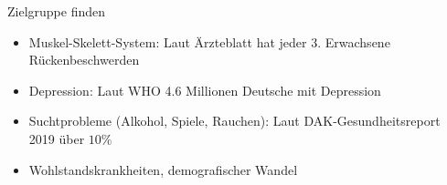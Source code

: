\documentclass[aspectratio=169,t]{beamer}
\begin{document}
\begin{frame}{Zielgruppe finden}
    \begin{itemize}
        \item Muskel-Skelett-System: Laut Ärzteblatt hat jeder 3. Erwachsene Rückenbeschwerden
        \item Depression: Laut WHO 4.6 Millionen Deutsche mit Depression
        \item Suchtprobleme (Alkohol, Spiele, Rauchen): Laut DAK-Gesundheitsreport 2019 über $10\%$
        \item Wohlstandskrankheiten, demografischer Wandel
    \end{itemize}
\end{frame}
\end{document}
